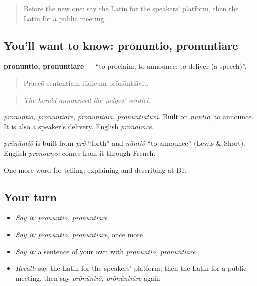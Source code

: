 \label{lesson:LA-C371-pronuntio}



\begin{quote}
Before the new one: say the Latin for the speakers' platform, then the Latin for a public meeting.
\end{quote}

\subsection*{You'll want to know: prōnūntiō, prōnūntiāre}
\textbf{prōnūntiō, prōnūntiāre} — \textquotedblleft{}to proclaim, to announce; to deliver (a speech)\textquotedblright{}.

\begin{quote}
Praecō sententiam iūdicum prōnūntiāvit.
\end{quote}

\begin{quote}
\emph{The herald announced the judges' verdict.}
\end{quote}

\emph{prōnūntiō, prōnūntiāre, prōnūntiāvī, prōnūntiātum}. Built on \emph{nūntiō}, to announce. It is also a speaker's delivery. English \emph{pronounce}.

\begin{cousinweb}
\emph{prōnūntiō} is built from \emph{prō} \textquotedblleft{}forth\textquotedblright{} and \emph{nūntiō} \textquotedblleft{}to announce\textquotedblright{} (Lewis \& Short). English \emph{pronounce} comes from it through French.
\end{cousinweb}

\begin{grammarlens}[title={What you've built}]
One more word for telling, explaining and describing at B1.
\end{grammarlens}

\subsection*{Your turn}
\begin{itemize}
\raggedright
  \item \emph{Say it:} \emph{prōnūntiō, prōnūntiāre}
  \item \emph{Say it:} \emph{prōnūntiō, prōnūntiāre}, once more
  \item \emph{Say it:} a sentence of your own with \emph{prōnūntiō, prōnūntiāre}
  \item \emph{Recall:} say the Latin for the speakers' platform, then the Latin for a public meeting, then say \emph{prōnūntiō, prōnūntiāre} again
\end{itemize}

